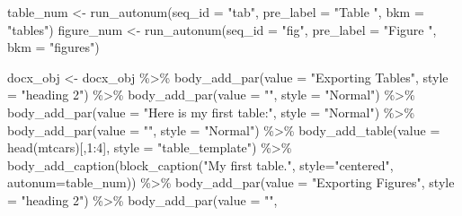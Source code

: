 \documentclass[
]{krantz}
\makeatletter
\newenvironment{Shaded}{\begin{snugshade}}{\end{snugshade}}
\newcommand{\AttributeTok}[1]{\textcolor[rgb]{0.61,0.61,0.61}{#1}}
\newcommand{\DecValTok}[1]{\textcolor[rgb]{0.06,0.06,0.06}{#1}}
\newcommand{\FunctionTok}[1]{\textcolor[rgb]{0,0,0}{#1}}
\newcommand{\NormalTok}[1]{#1}
\newcommand{\OtherTok}[1]{\textcolor[rgb]{0.37,0.37,0.37}{#1}}
\newcommand{\SpecialCharTok}[1]{\textcolor[rgb]{0,0,0}{#1}}
\newcommand{\StringTok}[1]{\textcolor[rgb]{0.5,0.5,0.5}{#1}}
\newenvironment{kframe}{%
\medskip{}
\setlength{\fboxsep}{.8em}
 \def\at@end@of@kframe{}%
 \ifinner\ifhmode%
  \def\at@end@of@kframe{\end{minipage}}%
  \begin{minipage}{\columnwidth}%
 \fi\fi%
 \def\FrameCommand##1{\hskip\@totalleftmargin \hskip-\fboxsep
 \colorbox{shadecolor}{##1}\hskip-\fboxsep
     \hskip-\linewidth \hskip-\@totalleftmargin \hskip\columnwidth}%
 \MakeFramed {\advance\hsize-\width
   \@totalleftmargin\z@ \linewidth\hsize
   \@setminipage}}%
 {\par\unskip\endMakeFramed%
 \at@end@of@kframe}
\renewenvironment{Shaded}{\begin{kframe}}{\end{kframe}}
\makeatother
\begin{document}
\begin{Shaded}
\begin{Highlighting}[]
\NormalTok{table\_num }\OtherTok{\textless{}{-}} \FunctionTok{run\_autonum}\NormalTok{(}\AttributeTok{seq\_id =} \StringTok{"tab"}\NormalTok{, }
                         \AttributeTok{pre\_label =} \StringTok{"Table "}\NormalTok{, }\AttributeTok{bkm =} \StringTok{"tables"}\NormalTok{)}
\NormalTok{figure\_num }\OtherTok{\textless{}{-}} \FunctionTok{run\_autonum}\NormalTok{(}\AttributeTok{seq\_id =} \StringTok{"fig"}\NormalTok{, }
                          \AttributeTok{pre\_label =} \StringTok{"Figure "}\NormalTok{, }\AttributeTok{bkm =} \StringTok{"figures"}\NormalTok{)}

\NormalTok{docx\_obj }\OtherTok{\textless{}{-}}\NormalTok{ docx\_obj }\SpecialCharTok{\%\textgreater{}\%} 
  \FunctionTok{body\_add\_par}\NormalTok{(}\AttributeTok{value =} \StringTok{"Exporting Tables"}\NormalTok{, }
               \AttributeTok{style =} \StringTok{"heading 2"}\NormalTok{) }\SpecialCharTok{\%\textgreater{}\%} 
  \FunctionTok{body\_add\_par}\NormalTok{(}\AttributeTok{value =} \StringTok{""}\NormalTok{, }
               \AttributeTok{style =} \StringTok{"Normal"}\NormalTok{) }\SpecialCharTok{\%\textgreater{}\%} 
  \FunctionTok{body\_add\_par}\NormalTok{(}\AttributeTok{value =} \StringTok{"Here is my first table:"}\NormalTok{, }
               \AttributeTok{style =} \StringTok{"Normal"}\NormalTok{) }\SpecialCharTok{\%\textgreater{}\%} 
  \FunctionTok{body\_add\_par}\NormalTok{(}\AttributeTok{value =} \StringTok{""}\NormalTok{, }
               \AttributeTok{style =} \StringTok{"Normal"}\NormalTok{) }\SpecialCharTok{\%\textgreater{}\%} 
  \FunctionTok{body\_add\_table}\NormalTok{(}\AttributeTok{value =} \FunctionTok{head}\NormalTok{(mtcars)[,}\DecValTok{1}\SpecialCharTok{:}\DecValTok{4}\NormalTok{], }
                 \AttributeTok{style =} \StringTok{"table\_template"}\NormalTok{) }\SpecialCharTok{\%\textgreater{}\%} 
  \FunctionTok{body\_add\_caption}\NormalTok{(}\FunctionTok{block\_caption}\NormalTok{(}\StringTok{"My first table."}\NormalTok{, }
                                 \AttributeTok{style=}\StringTok{"centered"}\NormalTok{, }
                                 \AttributeTok{autonum=}\NormalTok{table\_num)) }\SpecialCharTok{\%\textgreater{}\%} 
  \FunctionTok{body\_add\_par}\NormalTok{(}\AttributeTok{value =} \StringTok{"Exporting Figures"}\NormalTok{, }
               \AttributeTok{style =} \StringTok{"heading 2"}\NormalTok{) }\SpecialCharTok{\%\textgreater{}\%} 
  \FunctionTok{body\_add\_par}\NormalTok{(}\AttributeTok{value =} \StringTok{""}\NormalTok{, }

\end{Highlighting}
\end{Shaded}
\end{document}
